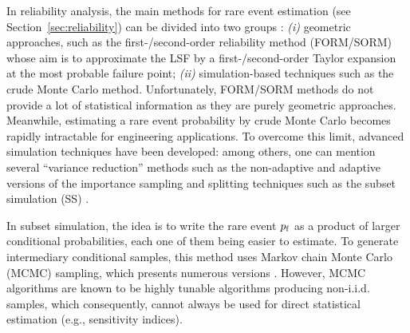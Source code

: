 
In reliability analysis, the main methods for rare event estimation (see Section~\ref{sec:reliability}) can be divided into two groups \citep{MorioBalesdent2015}: 
\textit{(i)} geometric approaches, such as the first-/second-order reliability method (FORM/SORM) whose aim is to approximate the LSF by a first-/second-order Taylor expansion at the most probable failure point; 
\textit{(ii)} simulation-based techniques such as the crude Monte Carlo method. 
Unfortunately, FORM/SORM methods do not provide a lot of statistical information as they are purely geometric approaches.
Meanwhile, estimating a rare event probability by crude Monte Carlo becomes rapidly intractable for engineering applications. 
To overcome this limit, advanced simulation techniques have been developed: among others, one can mention several ``variance reduction'' methods such as the non-adaptive and adaptive versions of the importance sampling \citep{RubinsteinKroese1981} and splitting techniques \citep{cerou2012sequential} such as the subset simulation (SS) \citep{AuBeck2001}.

In subset simulation, the idea is to write the rare event $p_\mathrm{f}$ as a product of larger conditional probabilities, each one of them being easier to estimate. 
To generate intermediary conditional samples, this method uses Markov chain Monte Carlo (MCMC) sampling, which presents numerous versions \citep{Papaioannou_PEM_2015}. 
However, MCMC algorithms are known to be highly tunable algorithms producing non-i.i.d. samples, which consequently, cannot always be used for direct statistical estimation (e.g., sensitivity indices). 

